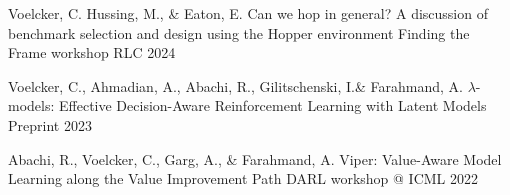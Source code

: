   \cventry
    {Voelcker, C. Hussing, M., \& Eaton, E.} %
    {Can we hop in general? A discussion of benchmark selection and design using the Hopper environment}
    {Finding the Frame workshop \@ RLC 2024} %
    {} %
    {
    }

  \cventry
    {Voelcker, C., Ahmadian, A., Abachi, R., Gilitschenski, I.\& Farahmand, A.} %
    {$\lambda$-models: Effective Decision-Aware Reinforcement Learning with Latent Models}
    {Preprint 2023} %
    {} %
    {
    }

  \cventry
    {Abachi, R., Voelcker, C., Garg, A., \& Farahmand, A.} %
    {Viper: Value-Aware Model Learning along the Value Improvement Path} %
    {DARL workshop @ ICML 2022} %
    {} %
    {
    }

\begin{cventries}


\end{cventries}

